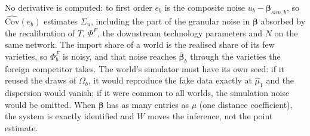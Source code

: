 No derivative is computed: to first order $e_b$ is the composite noise $u_b-\boldsymbol\beta_{sim,b}$, so $\widehat{\mathrm{Cov}}(e_b)$ estimates $\Sigma_u$, including the part of the granular noise in $\boldsymbol\beta$ absorbed by the recalibration of $T$, $\Phi^F$, the downstream technology parameters and $N$ on the same network. The import share of a world is the realised share of its few varieties, so $\Phi^F_b$ is noisy, and that noise reaches $\bar{\boldsymbol\beta}_b$ through the varieties the foreign competitor takes. The world's simulator must have its own seed: if it reused the draws of $\Omega_b$, it would reproduce the fake data exactly at $\hat\mu_1$ and the dispersion would vanish; if it were common to all worlds, the simulation noise would be omitted. When $\boldsymbol\beta$ has as many entries as $\mu$ (one distance coefficient), the system is exactly identified and $W$ moves the inference, not the point estimate.

